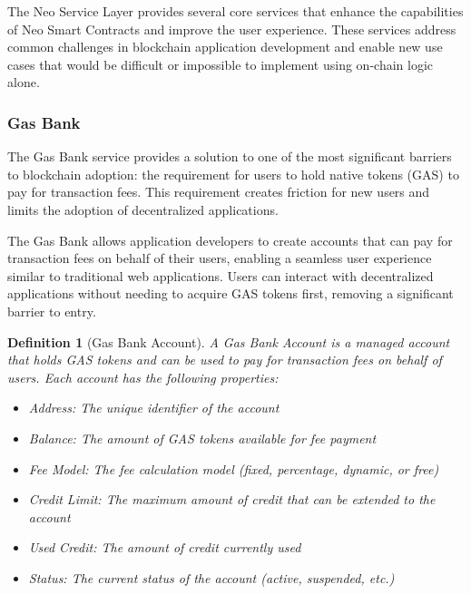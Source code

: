 \documentclass{article}
\newtheorem{definition}{Definition}
\begin{document}
The Neo Service Layer provides several core services that enhance the capabilities of Neo Smart Contracts and improve the user experience. These services address common challenges in blockchain application development and enable new use cases that would be difficult or impossible to implement using on-chain logic alone.

\subsubsection{Gas Bank}
\label{subsubsec:gas-bank}

The Gas Bank service provides a solution to one of the most significant barriers to blockchain adoption: the requirement for users to hold native tokens (GAS) to pay for transaction fees. This requirement creates friction for new users and limits the adoption of decentralized applications.



The Gas Bank allows application developers to create accounts that can pay for transaction fees on behalf of their users, enabling a seamless user experience similar to traditional web applications. Users can interact with decentralized applications without needing to acquire GAS tokens first, removing a significant barrier to entry.

\begin{definition}[Gas Bank Account]
A Gas Bank Account is a managed account that holds GAS tokens and can be used to pay for transaction fees on behalf of users. Each account has the following properties:
\begin{itemize}
    \item Address: The unique identifier of the account
    \item Balance: The amount of GAS tokens available for fee payment
    \item Fee Model: The fee calculation model (fixed, percentage, dynamic, or free)
    \item Credit Limit: The maximum amount of credit that can be extended to the account
    \item Used Credit: The amount of credit currently used
    \item Status: The current status of the account (active, suspended, etc.)
\end{itemize}
\end{definition}
\end{document}
